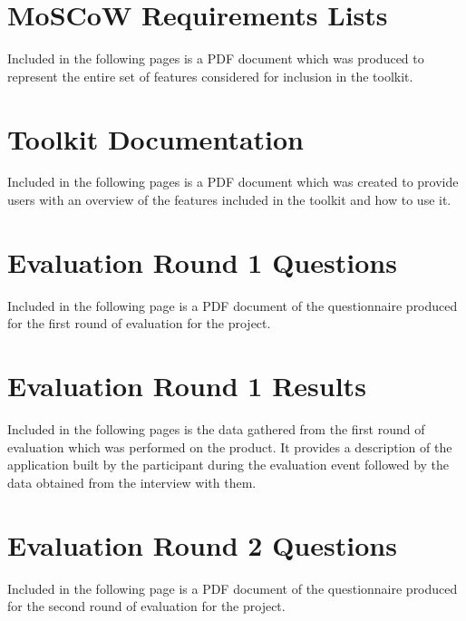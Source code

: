 \documentclass{l4proj}
\begin{document}
\begin{appendices}


\chapter{MoSCoW Requirements Lists}
\label{sec:appendmoscow}
Included in the following pages is a PDF document which was produced to represent the entire set of features considered for inclusion in the toolkit. 



\chapter{Toolkit Documentation}
\label{sec:appendscriptdocs}
Included in the following pages is a PDF document which was created to provide users with an overview of the features included in the toolkit and how to use it. 



\chapter{Evaluation Round 1 Questions}
\label{sec:appendeval1questions}
Included in the following page is a PDF document of the questionnaire produced for the first round of evaluation for the project.



\chapter{Evaluation Round 1 Results}
\label{sec:appendeval1results}
Included in the following pages is the data gathered from the first round of evaluation which was performed on the product. It provides a description of the application built by the participant during the evaluation event followed by the data obtained from the interview with them.



\chapter{Evaluation Round 2 Questions}
\label{sec:appendeval2questions}
Included in the following page is a PDF document of the questionnaire produced for the second round of evaluation for the project.


\end{appendices}
\end{document}
